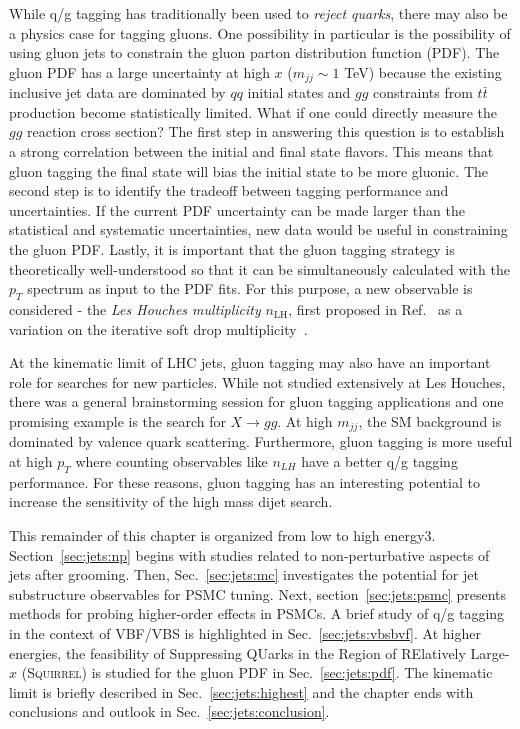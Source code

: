 \documentclass[11pt]{cernrep}
\begin{document}
While q/g tagging has traditionally been used to \textit{reject quarks}, there may also be a physics case for tagging gluons.  One possibility in particular is the possibility of using gluon jets to constrain the gluon parton distribution function (PDF).  The gluon PDF has a large uncertainty at high $x$ ($m_{jj}\sim 1$ TeV) because the existing inclusive jet data are dominated by $qq$ initial states and $gg$ constraints from $t\bar{t}$ production become statistically limited.  What if one could directly measure the $gg$ reaction cross section?  The first step in answering this question is to establish a strong correlation between the initial and final state flavors.  This means that gluon tagging the final state will bias the initial state to be more gluonic.   The second step is to identify the tradeoff between tagging performance and uncertainties.  If the current PDF uncertainty can be made larger than the statistical and systematic uncertainties, new data would be useful in constraining the gluon PDF.  Lastly, it is important that the gluon tagging strategy is theoretically well-understood so that it can be simultaneously calculated with the $p_T$ spectrum as input to the PDF fits.  For this purpose, a new observable is considered - the \textit{Les Houches multiplicity} $n_\text{LH}$, first proposed in Ref.~\cite{Marzani:2019hun} as a variation on the iterative soft drop multiplicity~\cite{Frye:2017yrw}.

At the kinematic limit of LHC jets, gluon tagging may also have an important role for searches for new particles.  While not studied extensively at Les Houches, there was a general brainstorming session for gluon tagging applications and one promising example is the search for $X\rightarrow gg$.  At high $m_{jj}$, the SM background is dominated by valence quark scattering.  Furthermore, gluon tagging is more useful at high $p_T$ where counting observables like $n_{LH}$ have a better q/g tagging performance.  For these reasons, gluon tagging has an interesting potential to increase the sensitivity of the high mass dijet search.

This remainder of this chapter is organized from low to high energy3.  Section~\ref{sec:jets:np} begins with studies related to non-perturbative aspects of jets after grooming.  Then, Sec.~\ref{sec:jets:mc} investigates the potential for jet substructure observables for PSMC tuning.  Next, section~\ref{sec:jets:psmc} presents methods for probing higher-order effects in PSMCs.  A brief study of q/g tagging in the context of VBF/VBS is highlighted in Sec.~\ref{sec:jets:vbsbvf}.  At higher energies, the feasibility of Suppressing QUarks in the Region of RElatively Large-$x$ (\textsc{Squirrel}) is studied for the gluon PDF in Sec.~\ref{sec:jets:pdf}.  The kinematic limit is briefly described in Sec.~\ref{sec:jets:highest} and the chapter ends with conclusions and outlook in Sec.~\ref{sec:jets:conclusion}.
\end{document}
